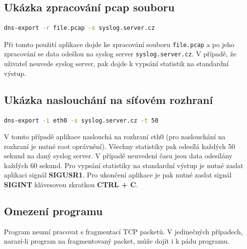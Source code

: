 \documentclass[a4paper, 11pt]{article}
\begin{document}
\subsection{Ukázka zpracování pcap souboru}
\begin{lstlisting}[language=bash]
 dns-export -r file.pcap -s syslog.server.cz
\end{lstlisting}
Při tomto použití aplikace dojde ke zpracování souboru \verb|file.pcap| a po jeho zpracování se data odešlou na syslog server \verb|syslog.server.cz|. V případě, že uživatel neuvede syslog server, pak dojde k vypsání statistik na standardní výstup.

\subsection{Ukázka naslouchání na síťovém rozhraní}
\begin{lstlisting}[language=bash]
 dns-export -i eth0 -s syslog.server.cz -t 50
\end{lstlisting}
V tomto případě aplikace naslouchá na rozhraní eth0 (pro naslouchání na rozhraní je nutné root oprávnění). Všechny statistiky pak odesílá každých 50 sekund na daný syslog server. V případě neuvedení času jsou data odesílány každých 60 sekund. Pro vypsání statistiky na standardní výstup je nutné zaslat aplikaci signál \textbf{SIGUSR1}. Pro ukončení aplikace je pak nutné zaslat signál \textbf{SIGINT} klávesovou zkratkou \textbf{CTRL + C}. 

\subsection{Omezení programu}
Program neumí pracovat s fragmentací TCP packetů. V jedinečných případech, narazí-li program na fragmentovaný packet, může dojít i k pádu programu.
\newpage

\end{document}
